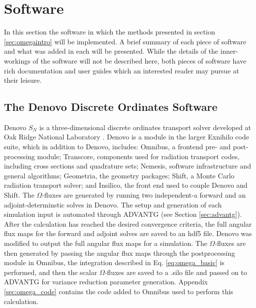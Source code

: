 \section{Software}
\label{sec:software}

In this section the software in which the methods presented in section
\ref{sec:omegaintro} will be implemented. A brief summary of each piece of
software and what was added in each will be presented.
While the details of the inner-workings of the software will not be described
here, both pieces of software have rich documentation and user guides which an
interested reader may pursue at their leisure.

\subsection{The Denovo Discrete Ordinates Software}

Denovo $S_N$ is a three-dimensional discrete ordinates transport solver
developed at Oak Ridge National Laboratory \cite{evans_denovo:_2010}. Denovo is a module in the larger
Exnihilo code suite, which in addition to Denovo,
includes: Omnibus, a frontend pre- and post-processing module; Transcore,
components used for radiation transport codes, including cross sections and
quadrature sets; Nemesis, software infrastructure and general algorithms;
Geometria, the geometry packages; Shift, a Monte Carlo radiation transport
solver; and Insilico, the front end used to couple Denovo and Shift. The
$\Omega$-fluxes are generated by running two independent-a forward and an
adjoint-determinstic solves in Denovo. The setup and generation of each
simulation input is automated through ADVANTG (see Section \ref{sec:advantg}).
After the calculation has reached the desired convergence criteria, the
full angular flux maps for the
forward and adjoint solves are saved to an hdf5 \cite{hdf5} file. Denovo was
modified to output the full angular flux maps for a simulation. The
$\Omega$-fluxes are then generated by passing the angular flux maps through the
postprocessing module in Omnibus, the integration described in Eq.
\ref{eq:omega_basic} is performed, and then the scalar $\Omega$-fluxes are saved
to a .silo file and passed on to ADVANTG for variance reduction parameter
generation. Appendix \ref{sec:omega_code} contains the code added to Omnibus
used to perform this calculation.

